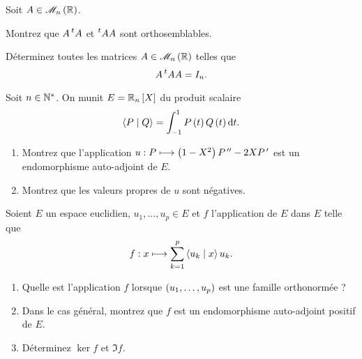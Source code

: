 \begin{exoss}
Soit \(A\in\M{n}[\R]\).

Montrez que \(A\prescript{t}{}{A}\) et \(\prescript{t}{}{A}A\) sont orthosemblables.
\end{exoss}

\begin{exoss}
Déterminez toutes les matrices \(A\in\M{n}[\R]\) telles que \[A\prescript{t}{}{A}A=I_n.\]
\end{exoss}

\begin{exoss}
Soit \(n\in\mathbb{N}^*\). On munit \(E=\polydeg[\R]{n}\) du produit scalaire \[\ps{P}{Q}=\int_{-1}^1P\paren{t}Q\paren{t}\odif{t}.\]

\begin{enumerate}
    \item Montrez que l'application \(u:P\longmapsto\left(1-X^2\right)P^{\,\prime\prime}-2XP^{\,\prime}\) est un endomorphisme auto-adjoint de \(E\). \\
    \item Montrez que les valeurs propres de \(u\) sont négatives.
\end{enumerate}
\end{exoss}

\begin{exoss}
Soient \(E\) un espace euclidien, \(u_1,\dots,u_p\in E\) et \(f\) l'application de \(E\) dans \(E\) telle que \[f:x\longmapsto\sum_{k=1}^p\left\langle u_k\;\middle|\; x\right\rangle u_k.\]

\begin{enumerate}
    \item Quelle est l'application \(f\) lorsque \(\left(u_1,\dots,u_p\right)\) est une famille orthonormée ? \\
    \item Dans le cas général, montrez que \(f\) est un endomorphisme auto-adjoint positif de \(E\). \\
    \item Déterminez \(\ker f\) et \(\Im f\).
\end{enumerate}
\end{exoss}


